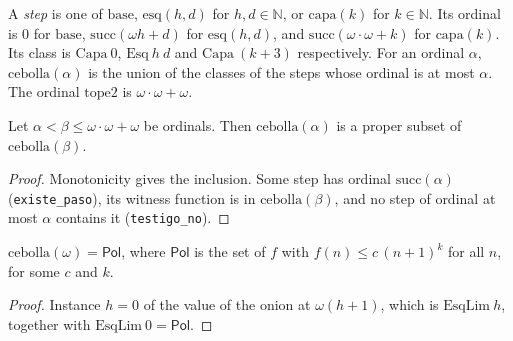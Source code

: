 \begin{definition}
  \label{def:scales-cebolla}
  \leanok
  A \emph{step} is one of $\mathrm{base}$, $\mathrm{esq}(h,d)$ for $h, d \in \mathbb{N}$, or
  $\mathrm{capa}(k)$ for $k \in \mathbb{N}$. Its ordinal is $0$ for $\mathrm{base}$,
  $\mathrm{succ}(\omega h + d)$ for $\mathrm{esq}(h,d)$, and $\mathrm{succ}(\omega\cdot\omega + k)$ for
  $\mathrm{capa}(k)$. Its class is $\mathrm{Capa}\ 0$, $\mathrm{Esq}\ h\ d$ and $\mathrm{Capa}\ (k+3)$
  respectively. For an ordinal $\alpha$, $\mathrm{cebolla}(\alpha)$ is the union of the classes of the
  steps whose ordinal is at most $\alpha$. The ordinal $\mathrm{tope2}$ is $\omega\cdot\omega+\omega$.
  \own{}
\end{definition}

\begin{theorem}
  \label{thm:scales-cebolla-strictmono}
  \leanok
  Let $\alpha < \beta \le \omega\cdot\omega+\omega$ be ordinals. Then $\mathrm{cebolla}(\alpha)$ is a
  proper subset of $\mathrm{cebolla}(\beta)$.
  \own{}
\end{theorem}

\begin{proof}
  \leanok
  Monotonicity gives the inclusion. Some step has ordinal $\mathrm{succ}(\alpha)$ (\texttt{existe\_paso}),
  its witness function is in $\mathrm{cebolla}(\beta)$, and no step of ordinal at most $\alpha$ contains it
  (\texttt{testigo\_no}).
\end{proof}

\begin{theorem}
  \label{thm:scales-cebolla-pol}
  \leanok
  $\mathrm{cebolla}(\omega) = \mathsf{Pol}$, where $\mathsf{Pol}$ is the set of $f$ with $f(n) \le c\,(n+1)^k$
  for all $n$, for some $c$ and $k$.
  \own{}
\end{theorem}

\begin{proof}
  \leanok
  Instance $h = 0$ of the value of the onion at $\omega(h+1)$, which is $\mathrm{EsqLim}\ h$, together with
  $\mathrm{EsqLim}\ 0 = \mathsf{Pol}$.
\end{proof}

